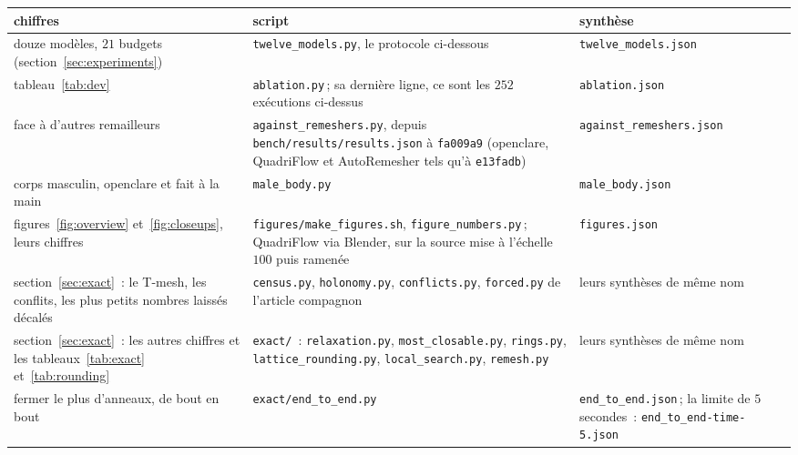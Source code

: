 \documentclass[11pt,a4paper]{article}
\begin{document}
\begin{center}
\small
\setlength{\tabcolsep}{4pt}
\begin{tabular}{@{}>{\raggedright\arraybackslash}p{5.6cm}>{\raggedright\arraybackslash}p{4.6cm}>{\raggedright\arraybackslash}p{4.4cm}@{}}
\toprule
chiffres & script & synthèse \\
\midrule
douze modèles, $21$ budgets (section~\ref{sec:experiments})
  & \texttt{twelve\_models.py}, le protocole ci-dessous
  & \texttt{twelve\_models.json} \\
tableau~\ref{tab:dev}
  & \texttt{ablation.py}\,; sa dernière ligne, ce sont les $252$ exécutions
  ci-dessus
  & \texttt{ablation.json} \\
face à d'autres remailleurs
  & \texttt{against\_remeshers.py}, depuis
  \nolinkurl{bench/results/results.json} à \texttt{fa009a9} (openclare,
  QuadriFlow et AutoRemesher tels qu'à \texttt{e13fadb})
  & \texttt{against\_remeshers.json} \\
corps masculin, openclare et fait à la main
  & \texttt{male\_body.py}
  & \texttt{male\_body.json} \\
figures~\ref{fig:overview} et~\ref{fig:closeups}, leurs chiffres
  & \texttt{figures/make\_figures.sh}, \texttt{figure\_numbers.py}\,;
  QuadriFlow via Blender, sur la source mise à l'échelle $100$ puis ramenée
  & \texttt{figures.json} \\
section~\ref{sec:exact}~: le T-mesh, les conflits, les plus petits nombres
laissés décalés
  & \texttt{census.py}, \texttt{holonomy.py}, \texttt{conflicts.py},
  \texttt{forced.py} de l'article compagnon
  & leurs synthèses de même nom \\
section~\ref{sec:exact}~: les autres chiffres et les
tableaux~\ref{tab:exact} et~\ref{tab:rounding}
  & \texttt{exact/}~: \texttt{relaxation.py}, \texttt{most\_closable.py},
  \texttt{rings.py}, \texttt{lattice\_rounding.py},
  \texttt{local\_search.py}, \texttt{remesh.py}
  & leurs synthèses de même nom \\
fermer le plus d'anneaux, de bout en bout
  & \texttt{exact/end\_to\_end.py}
  & \texttt{end\_to\_end.json}\,; la limite de $5$ secondes~:
  \texttt{end\_to\_end-time-5.json} \\
\bottomrule
\end{tabular}
\end{center}
\end{document}
